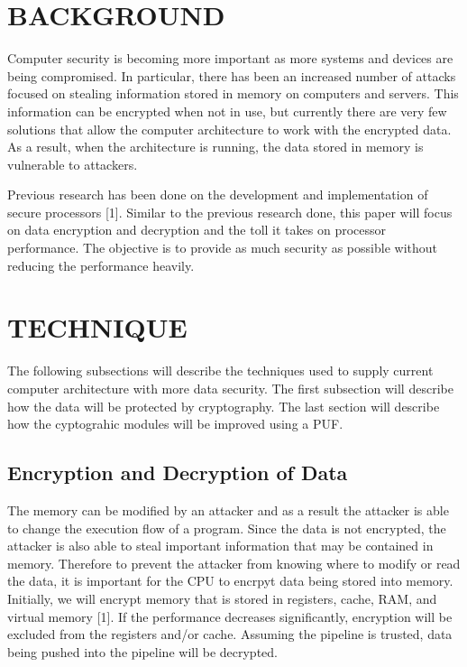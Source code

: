 \documentclass[letterpaper, 10 pt, conference]{ieeeconf}  %
\begin{document}
\section{BACKGROUND}

Computer security is becoming more important as more systems and devices are being compromised.  In particular, there has been an increased number of attacks focused on stealing information stored in memory on computers and servers.  This information can be encrypted when not in use, but currently there are very few solutions that allow the computer architecture to work with the encrypted data.  As a result, when the architecture is running, the data stored in memory is vulnerable to attackers.

Previous research has been done on the development and implementation of secure processors [1].  Similar to the previous research done, this paper will focus on data encryption and decryption and the toll it takes on processor performance.  The objective is to provide as much security as possible without reducing the performance heavily.

\section{TECHNIQUE}

The following subsections will describe the techniques used to supply current computer architecture with more data security. The first subsection will describe how the data will be protected by cryptography. The last section will describe how the cyptograhic modules will be improved using a PUF.

\subsection{Encryption and Decryption of Data}

The memory can be modified by an attacker and as a result the attacker is able to change the execution flow of a program.  Since the data is not encrypted, the attacker is also able to steal important information that may be contained in memory. Therefore to prevent the attacker from knowing where to modify or read the data, it is important for the CPU to encrpyt data being stored into memory. Initially, we will encrypt memory that is stored in registers, cache, RAM, and virtual memory [1]. If the performance decreases significantly, encryption will be excluded from the registers and/or cache. Assuming the pipeline is trusted, data being pushed into the pipeline will be decrypted.
\end{document}
